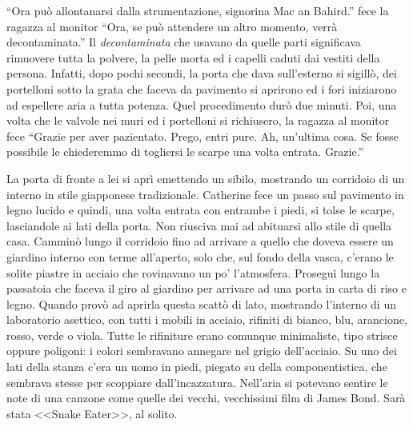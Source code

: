     ``Ora può allontanarsi dalla strumentazione, signorina Mac an Bahird.'' fece la ragazza al monitor ``Ora, se può
    attendere un altro momento, verrà decontaminata.'' Il \emph{decontaminata} che usavano da quelle parti significava
    rimuovere tutta la polvere, la pelle morta ed i capelli caduti dai vestiti della persona. Infatti, dopo pochi
    secondi, la porta che dava sull'esterno si sigillò, dei portelloni sotto la grata che faceva da pavimento si
    aprirono ed i fori iniziarono ad espellere aria a tutta potenza. Quel procedimento durò due minuti. Poi, una volta
    che le valvole nei muri ed i portelloni si richiusero, la ragazza al monitor fece ``Grazie per aver pazientato.
    Prego, entri pure. Ah, un'ultima cosa. Se fosse possibile le chiederemmo di togliersi le scarpe una volta entrata.
    Grazie.''

    La porta di fronte a lei si aprì emettendo un sibilo, mostrando un corridoio di un interno in stile giapponese
    tradizionale. Catherine fece un passo sul pavimento in legno lucido e quindi, una volta entrata con entrambe i
    piedi, si tolse le scarpe, lasciandole ai lati della porta. Non riusciva mai ad abituarsi allo stile di quella casa.
    Camminò lungo il corridoio fino ad arrivare a quello che doveva essere un giardino interno con terme all'aperto,
    solo che, sul fondo della vasca, c'erano le solite piastre in acciaio che rovinavano un po' l'atmosfera. Proseguì
    lungo la passatoia che faceva il giro al giardino per arrivare ad una porta in carta di riso e legno. Quando provò
    ad aprirla questa scattò di lato, mostrando l'interno di un laboratorio asettico, con tutti i mobili in acciaio,
    rifiniti di bianco, blu, arancione, rosso, verde o viola. Tutte le rifiniture erano comunque minimaliste, tipo
    strisce oppure poligoni: i colori sembravano annegare nel grigio dell'acciaio. Su uno dei lati della stanza c'era un uomo in piedi, piegato su della
    componentistica, che sembrava stesse per scoppiare dall'incazzatura. Nell'aria si potevano sentire le note di una
    canzone come quelle dei vecchi, vecchissimi film di James Bond. Sarà stata <<Snake Eater>>, al solito.

